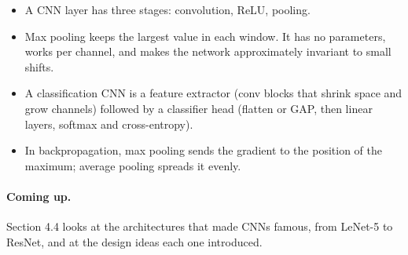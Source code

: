 \documentclass[12pt, a4paper]{article}
\begin{document}
\begin{itemize}
  \item A CNN layer has three stages: convolution, ReLU, pooling.
  \item Max pooling keeps the largest value in each window. It has no
        parameters, works per channel, and makes the network approximately
        invariant to small shifts.
  \item A classification CNN is a feature extractor (conv blocks that shrink
        space and grow channels) followed by a classifier head (flatten or
        GAP, then linear layers, softmax and cross-entropy).
  \item In backpropagation, max pooling sends the gradient to the position of
        the maximum; average pooling spreads it evenly.
\end{itemize}

\paragraph{Coming up.}
Section 4.4 looks at the architectures that made CNNs famous, from LeNet-5
to ResNet, and at the design ideas each one introduced.
\end{document}

